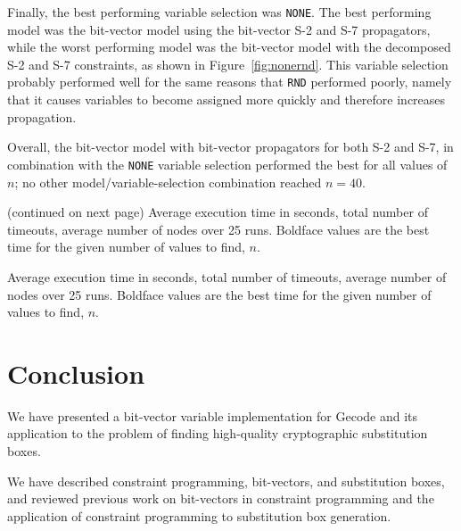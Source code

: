 \documentclass[a4paper,10pt,twoside,openright]{book}
\newcommand*\cd[1]{\texttt{#1}}
\begin{document}
Finally, the best performing variable selection was \cd{NONE}.
The best performing model
was the bit-vector model using the bit-vector S-2 and S-7 propagators, while
the worst performing model was the bit-vector model with the decomposed S-2 and S-7 constraints,
as shown in Figure~\ref{fig:nonernd}.
This variable selection probably performed well for the same reasons that \cd{RND} performed poorly, 
namely that it causes variables to become assigned more quickly and therefore increases propagation.

Overall, the bit-vector model with bit-vector propagators for both S-2 and S-7,
in combination with the \cd{NONE} variable selection performed the best for
all values of $n$; no other model/variable-selection combination reached $n=40$.
\newpage
\begin{table}[H]
    \centering
    \sffamily
    \robustify\bfseries%
    \setlength{\tabcolsep}{4pt}
    \small
    
    \caption[Experimental results]{
        (continued on next page)
        Average execution time in seconds, total number of timeouts, average number of nodes over 25 runs.
        Boldface values are the best time for the given number of values to find, $n$.}
    \label{tab:resultsall}
\end{table}
\newpage
\begin{table}[H]
    \centering
    \sffamily
    \robustify\bfseries%
    \setlength{\tabcolsep}{4pt}
    \small
    
    \caption*{
        Average execution time in seconds, total number of timeouts, average number of nodes over 25 runs.
        Boldface values are the best time for the given number of values to find, $n$.}
\end{table}
\newpage


\chapter{Conclusion}
\label{sec:conclusion}

We have presented a bit-vector variable implementation for Gecode
and its application to the problem of 
finding high-quality cryptographic substitution boxes. 

We have described constraint programming, bit-vectors, and substitution boxes,
and 
reviewed previous work on bit-vectors in constraint programming
and the application of constraint programming to substitution box generation.
\end{document}
